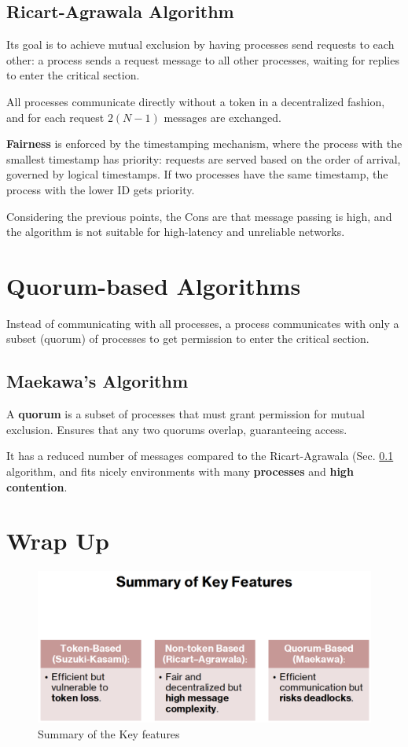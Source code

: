 \subsection{Ricart-Agrawala Algorithm}
\label{sec:04/ricart_agrawala}
Its goal is to achieve mutual exclusion by having processes send requests to each other: a process sends a request message to all other processes, waiting for replies to enter the critical section.

All processes communicate directly without a token in a decentralized fashion, and for each request $2(N-1)$ messages are exchanged.

\textbf{Fairness} is enforced by the timestamping mechanism, where the process with the smallest timestamp has priority: requests are served based on the order of arrival, governed by logical timestamps. If two processes have the same timestamp, the process with the lower ID gets priority.

Considering the previous points, the Cons are that message passing is high, and the algorithm is not suitable for high-latency and unreliable networks.

\section{Quorum-based Algorithms}

Instead of communicating with all processes, a process communicates with only a subset (quorum) of processes to get permission to enter the critical section.

\subsection{Maekawa's Algorithm}
A \textbf{quorum} is a subset of processes that must grant
permission for mutual exclusion.
Ensures that any two quorums overlap, guaranteeing access.

It has a reduced number of messages compared to the Ricart-Agrawala (Sec. \ref{sec:04/ricart_agrawala} algorithm, and fits nicely environments with many \textbf{processes} and \textbf{high contention}.

\section{Wrap Up}

\begin{figure}[htbp]
   \centering
   \includegraphics{images/04/wrapup_key.png}
   \caption{Summary of the Key features}
   \label{fig:04/wrapup_key}
\end{figure}

